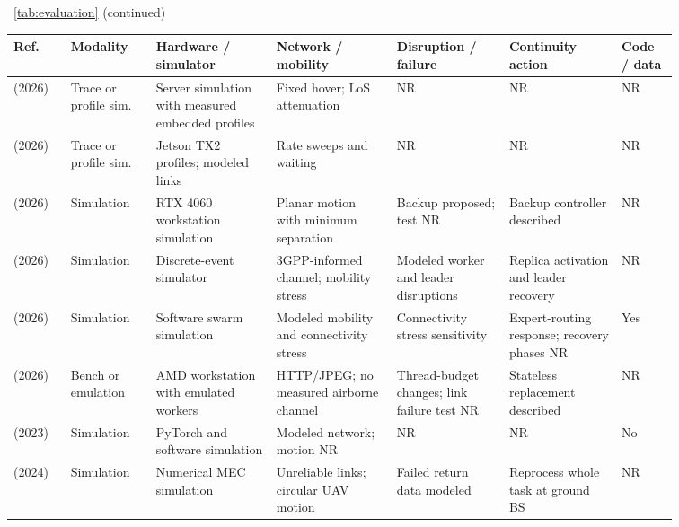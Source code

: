 \begin{table}[!tp]
\centering\footnotesize \MakeUppercase{\tablename}\ \ref{tab:evaluation} (continued)\par\smallskip
\centering
\fontsize{8}{10}\selectfont\setlength{\tabcolsep}{2.5pt}\renewcommand{\arraystretch}{1.08}
\begin{tabular}{@{}Y{0.0705\linewidth}Y{0.1090\linewidth}Y{0.1598\linewidth}Y{0.1532\linewidth}Y{0.1466\linewidth}Y{0.1438\linewidth}Y{0.0724\linewidth}@{}}
\toprule
Ref. & Modality & Hardware / simulator & Network / mobility & Disruption / failure & Continuity action & Code / data \\
\midrule
\cite{R0048}\newline\mbox{(2026)} & Trace or profile sim. & Server simulation with measured embedded profiles & Fixed hover; LoS attenuation & NR & NR & NR \\
\cite{R0075}\newline\mbox{(2026)} & Trace or profile sim. & Jetson TX2 profiles; modeled links & Rate sweeps and waiting & NR & NR & NR \\
\cite{R0095}\newline\mbox{(2026)} & Simulation & RTX 4060 workstation simulation & Planar motion with minimum separation & Backup proposed; test NR & Backup controller described & NR \\
\cite{R0110}\newline\mbox{(2026)} & Simulation & Discrete-event simulator & 3GPP-informed channel; mobility stress & Modeled worker and leader disruptions & Replica activation and leader recovery & NR \\
\cite{R0118}\newline\mbox{(2026)} & Simulation & Software swarm simulation & Modeled mobility and connectivity stress & Connectivity stress sensitivity & Expert-routing response; recovery phases NR & Yes \\
\cite{R0125}\newline\mbox{(2026)} & Bench or emulation & AMD workstation with emulated workers & HTTP\allowbreak{}/JPEG; no measured airborne channel & Thread-budget changes; link failure test NR & Stateless replacement described & NR \\
\cite{R0089}\newline\mbox{(2023)} & Simulation & PyTorch and software simulation & Modeled network; motion NR & NR & NR & No \\
\cite{R0044}\newline\mbox{(2024)} & Simulation & Numerical MEC simulation & Unreliable links; circular UAV motion & Failed return data modeled & Reprocess whole task at ground BS & NR \\

\end{tabular}
\end{table}
